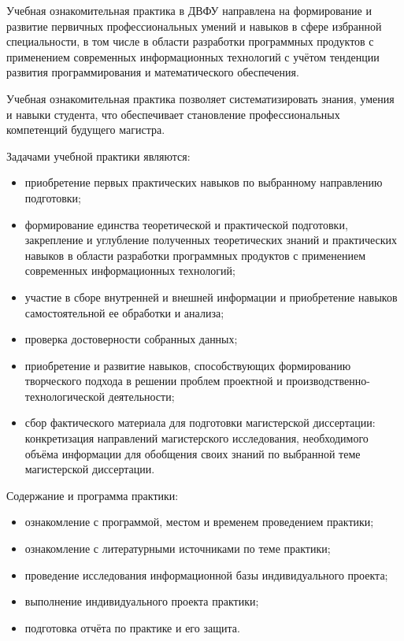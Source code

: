 \documentclass[../document.tex]{subfiles}
\begin{document}
    \par Учебная ознакомительная практика в ДВФУ направлена на формирование и развитие первичных профессиональных умений и навыков в сфере избранной специальности, в том числе в области разработки программных продуктов с применением современных информационных технологий с учётом тенденции развития программирования и математического обеспечения. 
    \par Учебная ознакомительная практика позволяет систематизировать знания, умения и навыки студента, что обеспечивает становление профессиональных компетенций будущего магистра.
    \par Задачами учебной практики являются:
    \begin{itemize}
        \item приобретение первых практических навыков по выбранному направлению подготовки;
        \item формирование единства теоретической и практической подготовки, закрепление и углубление полученных теоретических знаний и практических навыков в области разработки программных продуктов с применением современных информационных технологий;
        \item участие в сборе внутренней и внешней информации и приобретение навыков самостоятельной ее обработки и анализа;
        \item проверка достоверности собранных данных;
        \item приобретение и развитие навыков, способствующих формированию творческого подхода в решении проблем проектной и производственно-технологической деятельности;
        \item сбор фактического материала для подготовки магистерской диссертации: конкретизация направлений магистерского исследования, необходимого объёма информации для обобщения своих знаний по выбранной теме магистерской диссертации.
    \end{itemize}
    Содержание и программа практики:
    \begin{itemize}
        \item ознакомление с программой, местом и временем проведением практики;
        \item ознакомление с литературными источниками по теме практики;
        \item проведение исследования информационной базы индивидуального проекта;
        \item выполнение индивидуального проекта практики;
        \item подготовка отчёта по практике и его защита.
    \end{itemize}
\end{document}
